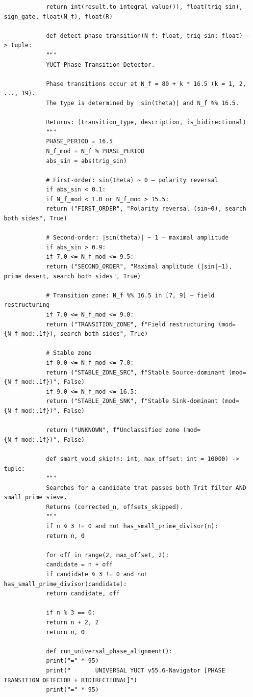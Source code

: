 \documentclass[12pt,a4paper]{article}
\theoremstyle{remark}
\begin{document}
\begin{tcolorbox}
\begin{lstlisting}
			return int(result.to_integral_value()), float(trig_sin), sign_gate, float(N_f), float(R)
			
			def detect_phase_transition(N_f: float, trig_sin: float) -> tuple:
			"""
			YUCT Phase Transition Detector.
			
			Phase transitions occur at N_f = 80 + k * 16.5 (k = 1, 2, ..., 19).
			The type is determined by |sin(theta)| and N_f %% 16.5.
			
			Returns: (transition_type, description, is_bidirectional)
			"""
			PHASE_PERIOD = 16.5
			N_f_mod = N_f % PHASE_PERIOD
			abs_sin = abs(trig_sin)
			
			# First-order: sin(theta) ~ 0 — polarity reversal
			if abs_sin < 0.1:
			if N_f_mod < 1.0 or N_f_mod > 15.5:
			return ("FIRST_ORDER", "Polarity reversal (sin~0), search both sides", True)
			
			# Second-order: |sin(theta)| ~ 1 — maximal amplitude
			if abs_sin > 0.9:
			if 7.0 <= N_f_mod <= 9.5:
			return ("SECOND_ORDER", "Maximal amplitude (|sin|~1), prime desert, search both sides", True)
			
			# Transition zone: N_f %% 16.5 in [7, 9] — field restructuring
			if 7.0 <= N_f_mod <= 9.0:
			return ("TRANSITION_ZONE", f"Field restructuring (mod={N_f_mod:.1f}), search both sides", True)
			
			# Stable zone
			if 0.0 <= N_f_mod <= 7.0:
			return ("STABLE_ZONE_SRC", f"Stable Source-dominant (mod={N_f_mod:.1f})", False)
			if 9.0 <= N_f_mod <= 16.5:
			return ("STABLE_ZONE_SNK", f"Stable Sink-dominant (mod={N_f_mod:.1f})", False)
			
			return ("UNKNOWN", f"Unclassified zone (mod={N_f_mod:.1f})", False)
			
			def smart_void_skip(n: int, max_offset: int = 10000) -> tuple:
			"""
			Searches for a candidate that passes both Trit filter AND small prime sieve.
			Returns (corrected_n, offsets_skipped).
			"""
			if n % 3 != 0 and not has_small_prime_divisor(n):
			return n, 0
			
			for off in range(2, max_offset, 2):
			candidate = n + off
			if candidate % 3 != 0 and not has_small_prime_divisor(candidate):
			return candidate, off
			
			if n % 3 == 0:
			return n + 2, 2
			return n, 0
			
			def run_universal_phase_alignment():
			print("=" * 95)
			print("       UNIVERSAL YUCT v55.6-Navigator [PHASE TRANSITION DETECTOR + BIDIRECTIONAL]")
			print("=" * 95)
			

\end{lstlisting}
\end{tcolorbox}
\end{document}
